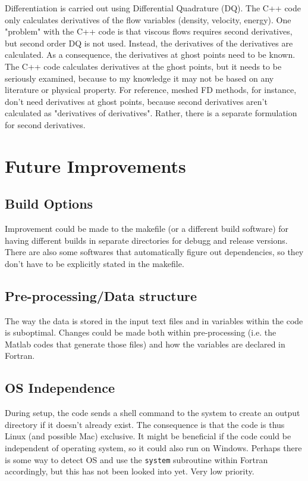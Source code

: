 \documentclass[12pt]{article}
\begin{document}
    Differentiation is carried out using Differential Quadrature (DQ). The C++ code only calculates derivatives of the flow variables (density, velocity, energy). One "problem" with the C++ code is that viscous flows requires second derivatives, but second order DQ is not used. Instead, the derivatives of the derivatives are calculated. As a consequence, the derivatives at ghost points need to be known. The C++ code calculates derivatives at the ghost points, but it needs to be seriously examined, because to my knowledge it may not be based on any literature or physical property. For reference, meshed FD methods, for instance, don't need derivatives at ghost points, because second derivatives aren't calculated as "derivatives of derivatives". Rather, there is a separate formulation for second derivatives.
    
    \newpage
    \section{Future Improvements}
    \subsection{Build Options}
    Improvement could be made to the makefile (or a different build software) for having different builds in separate directories for debugg and release versions. There are also some softwares that automatically figure out dependencies, so they don't have to be explicitly stated in the makefile.

    \subsection{Pre-processing/Data structure}
    The way the data is stored in the input text files and in variables within the code is suboptimal. Changes could be made both within pre-processing (i.e. the Matlab codes that generate those files) and how the variables are declared in Fortran.

    \subsection{OS Independence}
    During setup, the code sends a shell command to the system to create an output directory if it doesn't already exist. The consequence is that the code is thus Linux (and possible Mac) exclusive. It might be beneficial if the code could be independent of operating system, so it could also run on Windows. Perhaps there is some way to detect OS and use the \texttt{system} subroutine within Fortran accordingly, but this has not been looked into yet. Very low priority.
\end{document}
